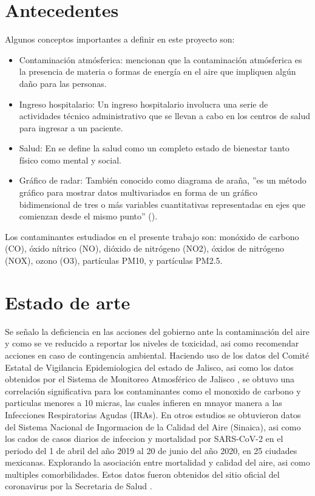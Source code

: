 \documentclass[a0]{sciposter} %
\begin{document}
\begin{multicols}{2}
\section{Antecedentes}
Algunos conceptos importantes a definir en este proyecto son:  
\begin{itemize}
    \item Contaminación atmósferica: \citet{bib4} mencionan que la contaminación atmósferica es la presencia de materia o formas de energía en el aire que impliquen algún daño para las personas.
    \item Ingreso hospitalario: Un ingreso hospitalario involucra una serie de actividades técnico administrativo que se llevan a cabo en los centros de salud para ingresar a un paciente.
    \item Salud: En \citet{bib3} se define la salud como un completo estado de bienestar tanto físico como mental y social.
    \item Gráfico de radar: También conocido como diagrama de araña, ''es un método gráfico para mostrar datos multivariados en forma de un gráfico bidimensional de tres o más variables cuantitativas representadas en ejes que comienzan desde el mismo punto'' (\citet{bib5}).  
\end{itemize}
 Los contaminantes estudiados en el presente trabajo son: monóxido de carbono (CO), óxido nítrico (NO), dióxido de nitrógeno (NO2), óxidos de nitrógeno (NOX), ozono (O3), partículas PM10, y partículas PM2.5.

\columnbreak
\section{Estado de arte}

Se señalo la deficiencia en las acciones del gobierno ante la contaminación del aire y como se ve reducido a reportar los niveles de toxicidad, asi como recomendar acciones en caso de contingencia ambiental. Haciendo uso de los datos del Comité Estatal de Vigilancia Epidemiologica del estado de Jalisco, asi como los datos obtenidos por el Sistema de Monitoreo Atmosférico de Jalisco \citet{bib1}, se obtuvo una correlación significativa para los contaminantes como el monoxido de carbono y particulas menores a 10 micras, las cuales infieren en mnayor manera a las Infecciones Respiratorias Agudas (IRAs). 
En otros estudios se obtuvieron datos del Sistema Nacional de Ingormacion de la Calidad del Aire (Sinaica), asi como los cados de casos diarios de infeccion y mortalidad por SARS-CoV-2 en el periodo del 1 de abril del año 2019 al 20 de junio del año 2020, en 25 ciudades mexicanas. Explorando la asociación entre mortalidad y calidad del aire, asi como multiples comorbilidades. Estos datos fueron obtenidos del sitio oficial del coronavirus por la Secretaria de Salud \citet{bib2}. 


\end{multicols}
\end{document}
